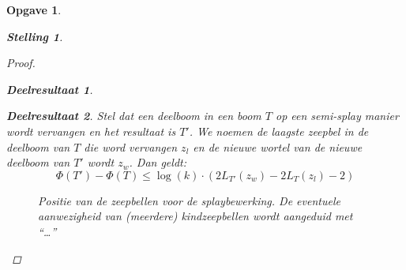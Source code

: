 \documentclass[12pt,hidelinks]{article}
\newtheorem{opgave}{Opgave}
\newtheorem{stelling}{Stelling}
\newtheorem{deelresultaat}{Deelresultaat}
\begin{document}
\begin{opgave}
\begin{description}
\begin{stelling}
\begin{proof}
\begin{deelresultaat}
\begin{itemize}
                            \end{itemize}
                        \end{deelresultaat}
                        \begin{deelresultaat}
                            Stel dat een deelboom in een boom $T$ op een semi-splay manier wordt vervangen en het resultaat is $T'$. We noemen de laagste zeepbel in de deelboom van $T$ die word vervangen $z_l$ en de nieuwe wortel van de nieuwe deelboom van $T'$ wordt $z_w$. Dan geldt:
                            \normalfont
                            $$\Phi(T') - \Phi(T) \le\log(k)\cdot( 2L_{T'}(z_w)-2L_T(z_l)-2)$$
                        \begin{figure}[H]
                            \centering
                            \caption{Positie van de zeepbellen voor de splaybewerking. De eventuele aanwezigheid van (meerdere) kindzeepbellen wordt aangeduid met ``\ldots''}

\end{figure}
\end{deelresultaat}
\end{proof}
\end{stelling}
\end{description}
\end{opgave}
\end{document}
